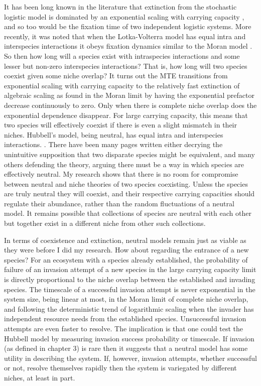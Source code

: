 It has been long known in the literature that extinction from the stochastic logistic model is dominated by an exponential scaling with carrying capacity \cite{Norden1982,Kamenev2008,Assaf2010,Ovaskainen2010}, and so too would be the fixation time of two independent logistic systems. 
More recently, it was noted that when the Lotka-Volterra model has equal intra and interspecies interactions it obeys fixation dynamics similar to the Moran model \cite{Lin2012,Constable2015,Chotibut2015,Young2018}. 
So then how long will a species exist with intraspecies interactions and some lesser but non-zero interspecies interactions? That is, how long will two species coexist given some niche overlap? 
It turns out the MTE transitions from exponential scaling with carrying capacity to the relatively fast extinction of algebraic scaling as found in the Moran limit by having the exponential prefactor decrease continuously to zero. 
Only when there is complete niche overlap does the exponential dependence disappear. 
For large carrying capacity, this means that two species will effectively coexist if there is even a slight mismatch in their niches. 
Hubbell's model, being neutral, has equal intra and interspecies interactions. . 
There have been many pages written either decrying the unintuitive supposition that two disparate species might be equivalent, and many others defending the theory, arguing there must be a way in which species are effectively neutral. 
My research shows that there is no room for compromise between neutral and niche theories of two species coexisting. 
Unless the species are truly neutral they will coexist, and their respective carrying capacities should regulate their abundance, rather than the random fluctuations of a neutral model. 
It remains possible that collections of species are neutral with each other but together exist in a different niche from other such collections. 

In terms of coexistence and extinction, neutral models remain just as viable as they were before I did my research. 
How about regarding the entrance of a new species? 
For an ecosystem with a species already established, the probability of failure of an invasion attempt of a new species in the large carrying capacity limit is directly proportional to the niche overlap between the established and invading species. 
The timescale of a successful invasion attempt is never exponential in the system size, being linear at most, in the Moran limit of complete niche overlap, and following the deterministic trend of logarithmic scaling when the invader has independent resource needs from the established species. 
Unsuccessful invasion attempts are even faster to resolve. 
The implication is that one could test the Hubbell model by measuring invasion success probability or timescale. 
If invasion (as defined in chapter 3) is rare then it suggests that a neutral model has some utility in describing the system. %
If, however, invasion attempts, whether successful or not, resolve themselves rapidly then the system is variegated by different niches, at least in part. 

